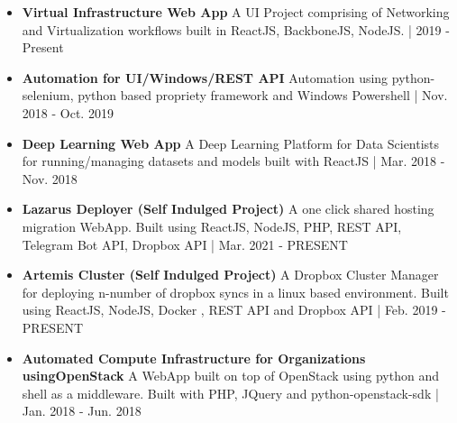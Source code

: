 \documentclass[10pt,a4paper,ragged2e]{altacv}
\begin{document}





\smallskip
\begin{itemize}
\item \textbf{Virtual Infrastructure Web App}
\newline
A UI Project comprising of Networking and Virtualization workflows built in ReactJS, BackboneJS, NodeJS. | 2019 - Present
\smallskip
\item \textbf{Automation for UI/Windows/REST API}
\newline
Automation using python-selenium, python based propriety framework and Windows Powershell | Nov. 2018 - Oct. 2019
\smallskip
\item \textbf{Deep Learning Web App}
\newline
A Deep Learning Platform for Data Scientists for running/managing datasets and models built with ReactJS | Mar. 2018 - Nov. 2018
\smallskip
\item \textbf{Lazarus Deployer (Self Indulged Project)}
\newline
A one click shared hosting migration WebApp. Built using ReactJS, NodeJS, PHP, REST API, Telegram Bot API, Dropbox API | Mar. 2021 - PRESENT
\smallskip
\item \textbf{Artemis Cluster (Self Indulged Project)}
\newline
A Dropbox Cluster Manager for deploying n-number of dropbox syncs in a linux based environment. Built using ReactJS, NodeJS, Docker , REST API and Dropbox API | Feb. 2019 - PRESENT
\smallskip
\item  \textbf{Automated Compute Infrastructure for Organizations using\newline OpenStack}
\newline
A WebApp built on top of OpenStack using python and shell as a middleware. Built with PHP, JQuery and python-openstack-sdk |  Jan. 2018 - Jun. 2018
\end{itemize}


\end{document}
